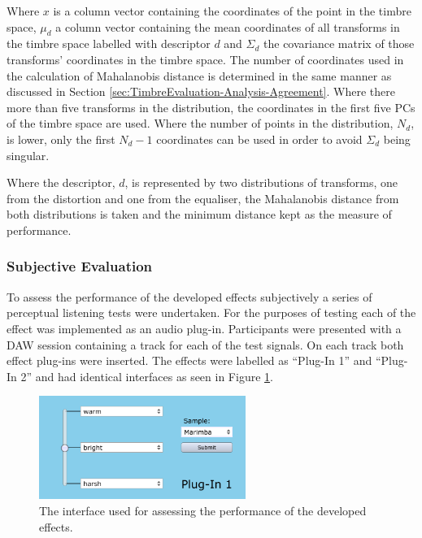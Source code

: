 			Where $x$ is a column vector containing the coordinates of the point in the timbre space, $\mu_{d}$
			a column vector containing the mean coordinates of all transforms in the timbre space labelled with
			descriptor $d$ and $\Sigma_{d}$ the covariance matrix of those transforms' coordinates in the timbre
			space. The number of coordinates used in the calculation of Mahalanobis distance is determined in
			the same manner as discussed in Section \ref{sec:TimbreEvaluation-Analysis-Agreement}. Where there
			more than five transforms in the distribution, the coordinates in the first five PCs of the timbre
			space are used. Where the number of points in the distribution, $N_{d}$, is lower, only the first
			$N_{d} - 1$ coordinates can be used in order to avoid $\Sigma_{d}$ being singular.

			Where the descriptor, $d$, is represented by two distributions of transforms, one from the
			distortion and one from the equaliser, the Mahalanobis distance from both distributions is taken and
			the minimum distance kept as the measure of performance.
	
		\subsubsection*{Subjective Evaluation}
			To assess the performance of the developed effects subjectively a series of perceptual listening
			tests were undertaken. For the purposes of testing each of the effect was implemented as an audio
			plug-in. Participants were presented with a DAW session containing a track for each of the test
			signals. On each track both effect plug-ins were inserted. The effects were labelled as ``Plug-In
			1'' and ``Plug-In 2'' and had identical interfaces as seen in Figure \ref{fig:TestPlugInterface}.

			\begin{figure}[h!]
				\centering
				\includegraphics[width=0.6\textwidth]{chapter7/Images/TestPlugInInterface.png}
				\caption{The interface used for assessing the performance of the developed effects.}
				\label{fig:TestPlugInterface}
			\end{figure}

